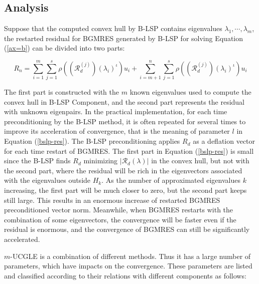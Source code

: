 \subsection{Analysis}

Suppose that the computed convex hull by B-LSP contains eigenvalues $\lambda_1,\cdots, \lambda_m$, the restarted residual for BGMRES generated by B-LSP for solving Equation (\ref{ax=b})  can be divided into two parts:

\begin{equation}
\label{bslp-res}
R_n = \sum_{i=1}^{m}\sum_{j=1}^{s}\rho((\mathcal{R}_d^{(j)})(\lambda_i)^{\iota})u_i + \sum_{i=m+1}^{n}\sum_{j=1}^{s}\rho((\mathcal{R}_d^{(j)})(\lambda_i)^{\iota})u_i
\end{equation}


The first part is constructed with the $m$ known eigenvalues used to compute the convex hull in B-LSP Component, and the second part represents the residual with unknown eigenpairs. In the practical implementation, for each time preconditioning by the B-LSP method, it is often repeated for several times to improve its acceleration of convergence, that is the meaning of parameter $l$ in Equation (\ref{bslp-res}). The B-LSP preconditioning applies $R_d$ as a deflation vector for each time restart of BGMRES. The first part in Equation (\ref{bslp-res}) is small since the B-LSP finds $R_d$ minimizing $|\mathcal{R}_d(\lambda)|$ in the convex hull, but not with the second part, where the residual will be rich in the eigenvectors associated with the eigenvalues outside $H_k$. As the number of approximated eigenvalues $k$ increasing, the first part will be much closer to zero, but the second part keeps still large. This results in an enormous increase of restarted BGMRES preconditioned vector norm. Meanwhile, when BGMRES restarts with the combination of some eigenvectors, the convergence will be faster even if the residual is enormous, and the convergence of BGMRES can still be significantly accelerated.

$m$-UCGLE is a combination of different methods. Thus it has a large number of parameters, which have impacts on the convergence. These parameters are listed and classified according to their relations with different components as follows:

